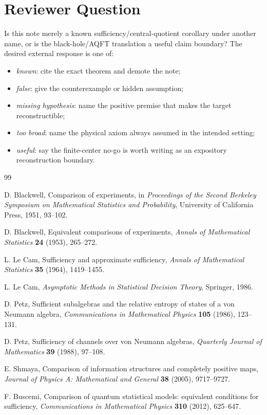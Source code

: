 \documentclass[12pt]{article}
\theoremstyle{definition}
\theoremstyle{remark}
\begin{document}
\section{Reviewer Question}

Is this note merely a known sufficiency/central-quotient corollary under
another name, or is the black-hole/AQFT translation a useful claim boundary?
The desired external response is one of:

\begin{itemize}
  \item \emph{known}: cite the exact theorem and demote the note;
  \item \emph{false}: give the counterexample or hidden assumption;
  \item \emph{missing hypothesis}: name the positive premise that makes the
    target reconstructible;
  \item \emph{too broad}: name the physical axiom always assumed in the
    intended setting;
  \item \emph{useful}: say the finite-center no-go is worth writing as an
    expository reconstruction boundary.
\end{itemize}

\begin{thebibliography}{99}

D. Blackwell,
Comparison of experiments,
in \emph{Proceedings of the Second Berkeley Symposium on Mathematical
Statistics and Probability}, University of California Press, 1951, 93--102.

D. Blackwell,
Equivalent comparisons of experiments,
\emph{Annals of Mathematical Statistics} \textbf{24} (1953), 265--272.

L. Le Cam,
Sufficiency and approximate sufficiency,
\emph{Annals of Mathematical Statistics} \textbf{35} (1964), 1419--1455.

L. Le Cam,
\emph{Asymptotic Methods in Statistical Decision Theory},
Springer, 1986.

D. Petz,
Sufficient subalgebras and the relative entropy of states of a von Neumann
algebra,
\emph{Communications in Mathematical Physics} \textbf{105} (1986), 123--131.

D. Petz,
Sufficiency of channels over von Neumann algebras,
\emph{Quarterly Journal of Mathematics} \textbf{39} (1988), 97--108.

E. Shmaya,
Comparison of information structures and completely positive maps,
\emph{Journal of Physics A: Mathematical and General} \textbf{38} (2005),
9717--9727.

F. Buscemi,
Comparison of quantum statistical models: equivalent conditions for
sufficiency,
\emph{Communications in Mathematical Physics} \textbf{310} (2012), 625--647.

\end{thebibliography}
\end{document}
